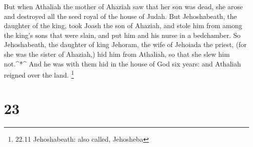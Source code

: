  But when Athaliah the mother of Ahaziah saw that her son
was dead, she arose and destroyed all the seed royal of the house of
Judah.  But Jehoshabeath, the daughter of the king, took
Joash the son of Ahaziah, and stole him from among the king's sons that
were slain, and put him and his nurse in a bedchamber. So Jehoshabeath,
the daughter of king Jehoram, the wife of Jehoiada the priest, (for she
was the sister of Ahaziah,) hid him from Athaliah, so that she slew him
not.\^{}*\^{}  And he was with them hid in the house of God
six years: and Athaliah reigned over the land. \footnote{22.11
  Jehoshabeath: also called, Jehosheba}

\hypertarget{section-22}{%
\section{23}\label{section-22}}


